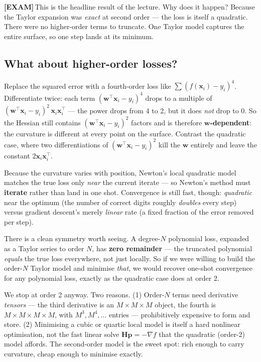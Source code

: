 \documentclass[11pt, a4paper]{article}
\newcommand{\examflag}{\textcolor{tipBd}{\textbf{[EXAM]}}\,}
\begin{document}
\examflag{}This is the headline result of the lecture. Why does it happen? Because the Taylor expansion was \emph{exact} at second order — the loss is itself a quadratic. There were no higher-order terms to truncate. One Taylor model captures the entire surface, so one step lands at its minimum.

\subsection{What about higher-order losses?}

Replace the squared error with a fourth-order loss like $\sum (f(\mathbf{x}_i) - y_i)^4$. Differentiate twice: each term $(\mathbf{w}^\top\mathbf{x}_i-y_i)^4$ drops to a multiple of $(\mathbf{w}^\top\mathbf{x}_i-y_i)^2\,\mathbf{x}_i\mathbf{x}_i^\top$ — the power drops from 4 to 2, but it does \emph{not} drop to 0. So the Hessian still contains $(\mathbf{w}^\top\mathbf{x}_i-y_i)^2$ factors and is therefore \textbf{$\mathbf{w}$-dependent}: the curvature is different at every point on the surface. Contrast the quadratic case, where two differentiations of $(\mathbf{w}^\top\mathbf{x}_i-y_i)^2$ kill the $\mathbf{w}$ entirely and leave the constant $2\mathbf{x}_i\mathbf{x}_i^\top$.

Because the curvature varies with position, Newton's local quadratic model matches the true loss only \emph{near} the current iterate — so Newton's method must \textbf{iterate} rather than land in one shot. Convergence is still fast, though: \emph{quadratic} near the optimum (the number of correct digits roughly \emph{doubles} every step) versus gradient descent's merely \emph{linear} rate (a fixed fraction of the error removed per step).

\begin{notebox}
There is a clean symmetry worth seeing. A degree-$N$ polynomial loss, expanded as a Taylor series to order $N$, has \textbf{zero remainder} — the truncated polynomial \emph{equals} the true loss everywhere, not just locally. So if we were willing to build the order-$N$ Taylor model and minimise \emph{that}, we would recover one-shot convergence for any polynomial loss, exactly as the quadratic case does at order 2.

We stop at order 2 anyway. Two reasons. (1) Order-$N$ terms need derivative \emph{tensors} — the third derivative is an $M\times M\times M$ object, the fourth is $M\times M\times M\times M$, with $M^3, M^4,\ldots$ entries — prohibitively expensive to form and store. (2) Minimising a cubic or quartic local model is itself a hard nonlinear optimisation, not the fast linear solve $\mathbf{H}\mathbf{p}=-\nabla f$ that the quadratic (order-2) model affords. The second-order model is the sweet spot: rich enough to carry curvature, cheap enough to minimise exactly.
\end{notebox}
\end{document}
